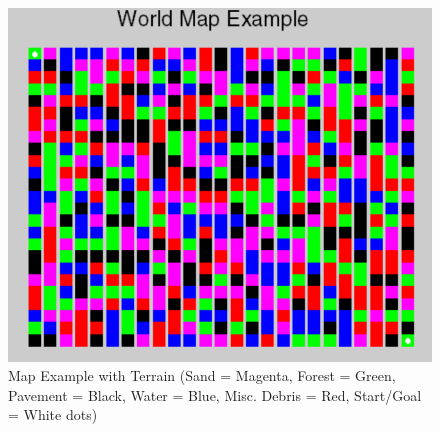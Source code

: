 \documentclass[12pt,american]{report}
\begin{document}
\begin{figure}
\centering
\includegraphics[scale=.5]{images/map-example.PNG}
\caption{Map Example with Terrain (Sand = Magenta, Forest = Green, Pavement = Black, Water = Blue, Misc. Debris = Red, Start/Goal = White dots)}
\label{fig:map-example}
\end{figure}
\end{document}
